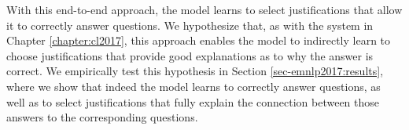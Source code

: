 With this end-to-end approach, the model learns to select justifications that allow it to correctly answer questions.  We hypothesize that, as with the system in Chapter \ref{chapter:cl2017}, this approach enables the model to indirectly learn to choose justifications that provide good explanations as to why the answer is correct. We empirically test this hypothesis in Section \ref{sec-emnlp2017:results}, where we show that
 indeed the model learns to correctly answer questions, as well as to select justifications that fully explain the connection between those answers to the corresponding questions.
